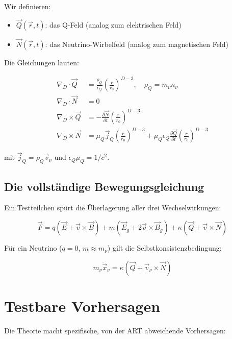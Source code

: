 \documentclass[12pt,a4paper]{article}
\begin{document}
Wir definieren:
\begin{itemize}
\item $\vec{Q}(\vec{r}, t)$: das Q-Feld (analog zum elektrischen Feld)
\item $\vec{N}(\vec{r}, t)$: das Neutrino-Wirbelfeld (analog zum magnetischen Feld)
\end{itemize}

Die Gleichungen lauten:

\begin{align}
\nabla_D \cdot \vec{Q} &= \frac{\rho_Q}{\epsilon_Q} \left( \frac{r}{r_0} \right)^{D-3}, \quad \rho_Q = m_\nu n_\nu \\
\nabla_D \cdot \vec{N} &= 0 \\
\nabla_D \times \vec{Q} &= -\frac{\partial \vec{N}}{\partial t} \left( \frac{r}{r_0} \right)^{D-3} \\
\nabla_D \times \vec{N} &= \mu_Q \vec{j}_Q \left( \frac{r}{r_0} \right)^{D-3} + \mu_Q \epsilon_Q \frac{\partial \vec{Q}}{\partial t} \left( \frac{r}{r_0} \right)^{D-3}
\end{align}

mit $\vec{j}_Q = \rho_Q \vec{v}_\nu$ und $\epsilon_Q \mu_Q = 1/c^2$.

\subsection{Die vollständige Bewegungsgleichung}

Ein Testteilchen spürt die Überlagerung aller drei Wechselwirkungen:

\begin{equation}
\vec{F} = q(\vec{E} + \vec{v} \times \vec{B}) + m(\vec{E}_g + 2\vec{v} \times \vec{B}_g) + \kappa(\vec{Q} + \vec{v} \times \vec{N})
\end{equation}

Für ein Neutrino ($q=0$, $m \approx m_\nu$) gilt die Selbstkonsistenzbedingung:

\begin{equation}
m_\nu \ddot{\vec{x}}_\nu = \kappa(\vec{Q} + \vec{v}_\nu \times \vec{N})
\end{equation}

\section{Testbare Vorhersagen}

Die Theorie macht spezifische, von der ART abweichende Vorhersagen:
\end{document}
